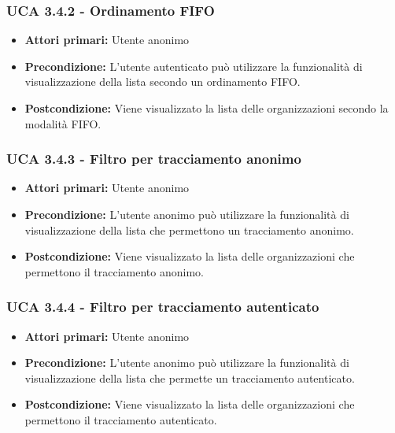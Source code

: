\subsubsection{UCA 3.4.2 - Ordinamento FIFO}%
\begin{itemize}	
	\item \textbf{Attori primari:} Utente anonimo
	\item \textbf{Precondizione:} L'utente autenticato può utilizzare la funzionalità di visualizzazione della lista secondo un ordinamento FIFO.
	\item \textbf{Postcondizione:} Viene visualizzato la lista delle organizzazioni secondo la modalità FIFO.
\end{itemize}

\subsubsection{UCA 3.4.3 - Filtro per tracciamento anonimo}%
\begin{itemize}
	\item \textbf{Attori primari:} Utente anonimo
	\item \textbf{Precondizione:} L'utente anonimo può utilizzare la funzionalità di visualizzazione della lista che permettono un tracciamento anonimo.
	\item \textbf{Postcondizione:} Viene visualizzato la lista delle organizzazioni che permettono il tracciamento anonimo.
\end{itemize}

\subsubsection{UCA 3.4.4 - Filtro per tracciamento autenticato}%
\begin{itemize}
	\item \textbf{Attori primari:} Utente anonimo
	\item \textbf{Precondizione:} L'utente anonimo può utilizzare la funzionalità di visualizzazione della lista che permette un tracciamento autenticato.
	\item \textbf{Postcondizione:} Viene visualizzato la lista delle organizzazioni che permettono il tracciamento autenticato.
\end{itemize}

\newpage

